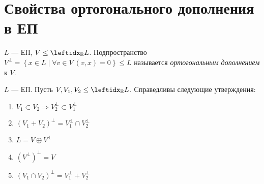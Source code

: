 \section{Свойства ортогонального дополнения в ЕП}

\begin{defn}
    $L$ --- ЕП, $V \le \lsub{\mathbb{R}}{L}$. Подпространство $V^\perp = \left\{x \in L \mid \forall v \in V\ (v, x) = 0 \right\} \le L$ называется \textit{ортогональным дополнением} к $V$.
\end{defn}

\begin{thm*}
    $L$ --- ЕП. Пусть $V, V_1, V_2 \le \lsub{\mathbb{R}}{L}$. Справедливы следующие утверждения:
    \begin{enumerate}
        \item $V_1 \subset V_2 \Rightarrow V_2^\perp \subset V_1^\perp$
        \item $(V_1 + V_2)^\perp = V_1^\perp \cap V_2^\perp$
        \item $L = V \oplus V^\perp$
        \item $(V^\perp)^\perp = V$
        \item $(V_1 \cap V_2)^\perp = V_1^\perp + V_2^\perp$
    \end{enumerate}
\end{thm*}

